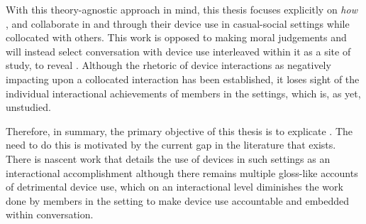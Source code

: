 With this theory-agnostic approach in mind, this thesis focuses explicitly on \textit{how} , and collaborate in and through their device use in casual-social settings while collocated with others.
This work is opposed to making moral judgements and will instead select conversation with device use interleaved within it as a site of study, to reveal .
Although the rhetoric of device interactions as negatively impacting upon a collocated interaction has been established, it loses sight of the individual interactional achievements of members in the settings, which is, as yet, unstudied.

Therefore, in summary, the primary objective of this thesis is to explicate .
The need to do this is motivated by the current gap in the literature that exists.
There is nascent work that details the use of devices in such settings as an interactional accomplishment although there remains multiple gloss-like accounts of detrimental device use, which on an interactional level diminishes the work done by members in the setting to make device use accountable and embedded within conversation.



